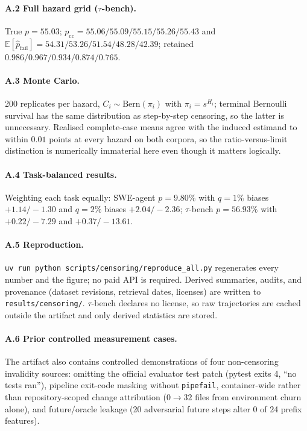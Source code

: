 \documentclass[letterpaper]{article}
\begin{document}
\paragraph{A.2 Full hazard grid ($\tau$-bench).} True $p=55.03$;
$p_{\mathrm{cc}}=55.06/55.09/55.15/55.26/55.43$ and
$\mathbb{E}[\hat p_{\mathrm{fail}}]=54.31/53.26/51.54/48.28/42.39$; retained
$0.986/0.967/0.934/0.874/0.765$.

\paragraph{A.3 Monte Carlo.} 200 replicates per hazard, $C_i\sim\mathrm{Bern}
(\pi_i)$ with $\pi_i=s^{H_i}$; terminal Bernoulli survival has the same
distribution as step-by-step censoring, so the latter is unnecessary. Realised
complete-case means agree with the induced estimand to within $0.01$ points at
every hazard on both corpora, so the ratio-versus-limit distinction is
numerically immaterial here even though it matters logically.

\paragraph{A.4 Task-balanced results.} Weighting each task equally: SWE-agent
$p=9.80\%$ with $q{=}1\%$ biases $+1.14/-1.30$ and $q{=}2\%$ biases
$+2.04/-2.36$; $\tau$-bench $p=56.93\%$ with $+0.22/-7.29$ and $+0.37/-13.61$.

\paragraph{A.5 Reproduction.} \texttt{uv run python
scripts/censoring/reproduce\_all.py} regenerates every number and the figure;
no paid API is required. Derived summaries, audits, and provenance (dataset
revisions, retrieval dates, licenses) are written to \texttt{results/censoring/}.
$\tau$-bench declares no license, so raw trajectories are cached outside the
artifact and only derived statistics are stored.

\paragraph{A.6 Prior controlled measurement cases.} The artifact also contains
controlled demonstrations of four non-censoring invalidity sources: omitting the
official evaluator test patch (pytest exits 4, ``no tests ran''), pipeline
exit-code masking without \texttt{pipefail}, container-wide rather than
repository-scoped change attribution ($0\!\to\!32$ files from environment churn
alone), and future/oracle leakage (20 adversarial future steps alter 0 of 24
prefix features).
\end{document}
